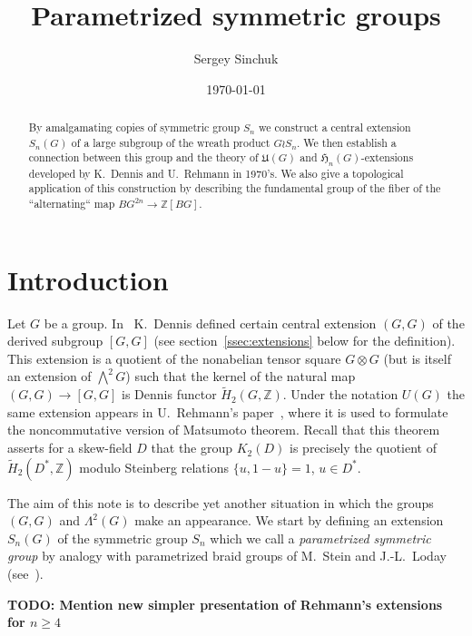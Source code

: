\documentclass[oneside, 12pt]{amsart}
\title{Parametrized symmetric groups}
\author {Sergey Sinchuk}
\date {\today}
\theoremstyle{plain}
\numberwithin{equation}{section}
\numberwithin{lemma}{section}
\theoremstyle{remark}
\theoremstyle{definition}
\begin{document}
\begin{abstract} By amalgamating copies of symmetric group $S_n$ we construct a central extension $S_n(G)$ of a large subgroup of the wreath product $G \wr S_n$.
We then establish a connection between this group and the theory of $\mathfrak{U}(G)$ and $\mathfrak{H}_n(G)$-extensions developed by K.~Dennis and U.~Rehmann in 1970's.
We also give a topological application of this construction by describing the fundamental group of the fiber of the ``alternating`` map $BG^{2n}\to \mathbb{Z}[BG]$.
\end{abstract}

\maketitle

\section{Introduction}
Let $G$ be a group. In~\cite{De76} K.~Dennis defined certain central extension $(G, G)$ of the derived subgroup $[G, G]$ 
 (see section~\ref{ssec:extensions} below for the definition).
This extension is a quotient of the nonabelian tensor square $G \otimes G$ (but is itself an extension of $\bigwedge^2G$) such that the kernel of the natural map $(G, G) \to [G, G]$ 
 is Dennis functor $\widetilde{H}_2(G, \mathbb{Z})$.
Under the notation $U(G)$ the same extension appears in U.~Rehmann's paper~\cite{Reh78}, where it is used to formulate the noncommutative version of Matsumoto theorem.
Recall that this theorem asserts for a skew-field $D$ that the group $K_2(D)$ is precisely the quotient of $\widetilde{H}_2(D^*, \mathbb{Z})$ modulo Steinberg relations $\{u, 1-u\} = 1$, $u\in D^*$.

The aim of this note is to describe yet another situation in which the groups $(G, G)$ and $\Lambda^2(G)$ make an appearance.
We start by defining an extension $S_n(G)$ of the symmetric group $S_n$ which we call a {\it parametrized symmetric group} by analogy
 with parametrized braid groups of M.~Stein and J.-L.~Loday (see~\cite{LS05}).

{\bf TODO: Mention new simpler presentation of Rehmann's extensions for $n\geq 4$}
\end{document}
